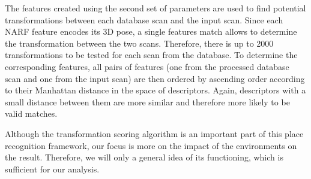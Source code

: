 The features created using the second set of parameters are used to find potential transformations between each database scan and the input scan. Since each NARF feature encodes its 3D pose, a single features match allows to determine the transformation between the two scans. Therefore, there is up to 2000 transformations to be tested for each scan from the database. To determine the corresponding features, all pairs of features (one from the processed database scan and one from the input scan) are then ordered by ascending order according to their Manhattan distance in the space of descriptors. Again, descriptors with a small distance between them are more similar and therefore more likely to be valid matches.

Although the transformation scoring algorithm is an important part of this place recognition framework, our focus is more on the impact of the environments on the result. Therefore, we will only a general idea of its functioning, which is sufficient for our analysis.

